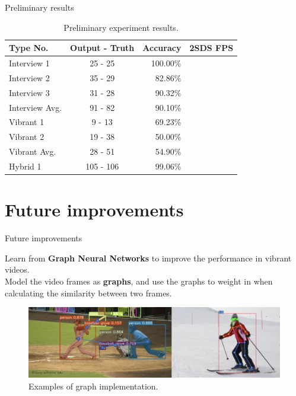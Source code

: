 \documentclass[aspectratio=43,display]{beamer}
\begin{document}
		\begin{frame}{Preliminary results}

			\begin{table}
				\centering
				\begin{tabular}{l c r r}
					\hline
					Type No. & Output - Truth & Accuracy & 2SDS FPS  \\
					\hline
					Interview 1 & 25 - 25 & 100.00\% & \\
					Interview 2 & 35 - 29 & 82.86\% & \\
					Interview 3 & 31 - 28 & 90.32\% & \\
					Interview Avg. & 91 - 82 & 90.10\% & \\
					\hline
					Vibrant 1 & 9 - 13 & 69.23\% & \\
					Vibrant 2 & 19 - 38 & 50.00\% & \\
					Vibrant Avg. & 28 - 51 & 54.90\% & \\
					\hline
					Hybrid 1 & 105 - 106 & 99.06\% & \\
					\hline
				\end{tabular}
			\caption{\label{tab:Results}Preliminary experiment results.}
			\end{table}

		\end{frame}


	\section{Future improvements}

		\begin{frame}{Future improvements}

			Learn from \textbf{Graph Neural Networks} to improve the performance in vibrant videos.\\
			Model the video frames as \textbf{graphs}, and use the graphs to weight in when calculating the similarity between two frames.

			\vskip 0.2cm

			\begin{figure}
				\includegraphics[width=\textwidth]{images/graph-exp.png}
				\caption{\label{fig:Graph-Example}Examples of graph implementation.}
			\end{figure}

		\end{frame}
\end{document}
